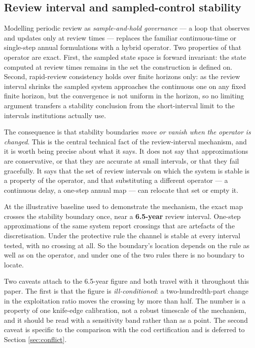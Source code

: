 \subsection{Review interval and sampled-control stability}
\label{sec:review}

Modelling periodic review as \emph{sample-and-hold governance} --- a loop that observes
and updates only at review times --- replaces the familiar continuous-time or single-step
annual formulations with a hybrid operator. Two properties of that operator are exact.
First, the sampled state space is forward invariant: the state computed at review times
remains in the set the construction is defined on. Second, rapid-review consistency holds
over finite horizons only: as the review interval shrinks the sampled system approaches
the continuous one on any fixed finite horizon, but the convergence is not uniform in the
horizon, so no limiting argument transfers a stability conclusion from the short-interval
limit to the intervals institutions actually use.

The consequence is that stability boundaries \emph{move or vanish when the operator is
changed}. This is the central technical fact of the review-interval mechanism, and it is
worth being precise about what it says. It does not say that approximations are
conservative, or that they are accurate at small intervals, or that they fail gracefully.
It says that the set of review intervals on which the system is stable is a property of
the operator, and that substituting a different operator --- a continuous delay, a
one-step annual map --- can relocate that set or empty it.

At the illustrative baseline used to demonstrate the mechanism, the exact map crosses the
stability boundary once, near a \textbf{6.5-year} review interval. One-step
approximations of the same system report crossings that are artefacts of the
discretisation. Under the protective rule the channel is stable at every interval tested,
with no crossing at all. So the boundary's location depends on the rule as well as on the
operator, and under one of the two rules there is no boundary to locate.

Two caveats attach to the 6.5-year figure and both travel with it throughout this paper.
The first is that the figure is \emph{ill-conditioned}: a two-hundredth-part change in the
exploitation ratio moves the crossing by more than half. The number is a property of one
knife-edge calibration, not a robust timescale of the mechanism, and it should be read
with a sensitivity band rather than as a point. The second caveat is specific to the
comparison with the cod certification and is deferred to Section \ref{sec:conflict}.

